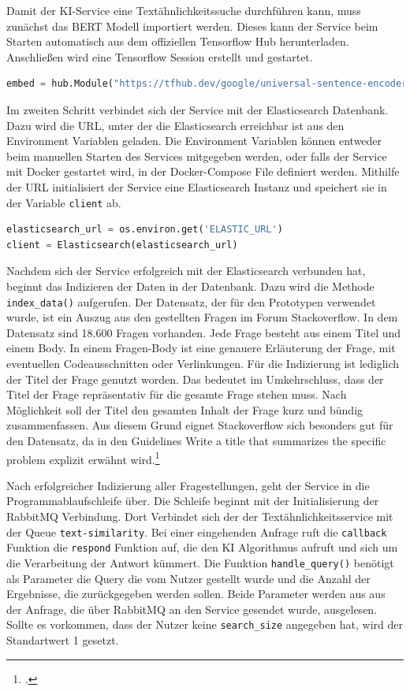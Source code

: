 Damit der KI-Service eine Textähnlichkeitssuche durchführen kann, muss zunächst das BERT Modell importiert werden. Dieses kann der Service beim Starten automatisch aus dem offiziellen Tensorflow Hub herunterladen. Anschließen wird eine Tensorflow Session erstellt und gestartet. 

\begin{lstlisting}[language=Python]
embed = hub.Module("https://tfhub.dev/google/universal-sentence-encoder/2")
\end{lstlisting}

Im zweiten Schritt verbindet sich der Service mit der Elasticsearch Datenbank. Dazu wird die URL, unter der die Elasticsearch erreichbar ist aus den Environment Variablen geladen. Die Environment Variablen können entweder beim manuellen Starten des Services mitgegeben werden, oder falls der Service mit Docker gestartet wird, in der Docker-Compose File definiert werden. Mithilfe der URL initialisiert der Service eine Elasticsearch Instanz und speichert sie in der Variable \texttt{client} ab. 

\begin{lstlisting}[language=Python]
elasticsearch_url = os.environ.get('ELASTIC_URL')
client = Elasticsearch(elasticsearch_url)
\end{lstlisting}

Nachdem sich der Service erfolgreich mit der Elasticsearch verbunden hat, beginnt das Indizieren der Daten in der Datenbank. Dazu wird die Methode \texttt{index\_{}data()} aufgerufen. Der Datensatz, der für den Prototypen verwendet wurde, ist ein Auszug aus den gestellten Fragen im Forum Stackoverflow. In dem Datensatz sind 18.600 Fragen vorhanden. Jede Frage besteht aus einem Titel und einem Body. In einem Fragen-Body ist eine genauere Erläuterung der Frage, mit eventuellen Codeausschnitten oder Verlinkungen. Für die Indizierung ist lediglich der Titel der Frage genutzt worden. Das bedeutet im Umkehrschluss, dass der Titel der Frage repräsentativ für die gesamte Frage stehen muss. Nach Möglichkeit soll der Titel den gesamten Inhalt der Frage kurz und bündig zusammenfassen. Aus diesem Grund eignet  Stackoverflow sich besonders gut für den Datensatz, da in den Guidelines \glqq Write a title that summarizes the specific problem\grqq{} explizit erwähnt wird.\footcite{stackoverflow2022question}

Nach erfolgreicher Indizierung aller Fragestellungen, geht der Service in die Programmablaufschleife über. Die Schleife beginnt mit der Initialisierung der RabbitMQ Verbindung. Dort Verbindet sich der der Textähnlichkeitsservice mit der Queue \texttt{text-similarity}. Bei einer eingehenden Anfrage ruft die \texttt{callback} Funktion die \texttt{respond} Funktion auf, die den KI Algorithmus aufruft und sich um die Verarbeitung der Antwort kümmert. Die Funktion \texttt{handle\_{}query()} benötigt als Parameter die Query die vom Nutzer gestellt wurde und die Anzahl der Ergebnisse, die zurückgegeben werden sollen. Beide Parameter werden aus aus der Anfrage, die über RabbitMQ an den Service gesendet wurde, ausgelesen. Sollte es vorkommen, dass der Nutzer keine \texttt{search\_{}size} angegeben hat, wird der Standartwert 1 gesetzt.
 
